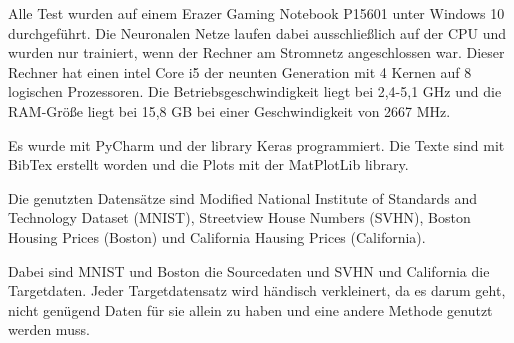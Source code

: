 Alle Test wurden auf einem Erazer Gaming Notebook P15601 unter Windows 10 durchgeführt.
Die Neuronalen Netze laufen dabei ausschließlich auf 
der CPU und wurden nur trainiert, wenn der Rechner am Stromnetz angeschlossen war. 
Dieser Rechner hat einen intel Core i5 der neunten Generation mit 4 Kernen auf 8 
logischen Prozessoren. Die Betriebsgeschwindigkeit liegt bei 2,4-5,1 GHz und die 
RAM-Größe liegt bei 15,8 GB bei einer Geschwindigkeit von 2667 MHz. 

Es wurde mit PyCharm und der library Keras programmiert. Die Texte sind mit BibTex 
erstellt worden und die Plots mit der MatPlotLib library.

Die genutzten Datensätze sind Modified National Institute of Standards and Technology Dataset (MNIST), 
Streetview House Numbers (SVHN), Boston Housing Prices (Boston) und California Hausing Prices (California).

Dabei sind MNIST und Boston die Sourcedaten und SVHN und California die Targetdaten. Jeder Targetdatensatz 
wird händisch verkleinert, da es darum geht, nicht genügend Daten für sie allein zu haben und eine andere 
Methode genutzt werden muss.
